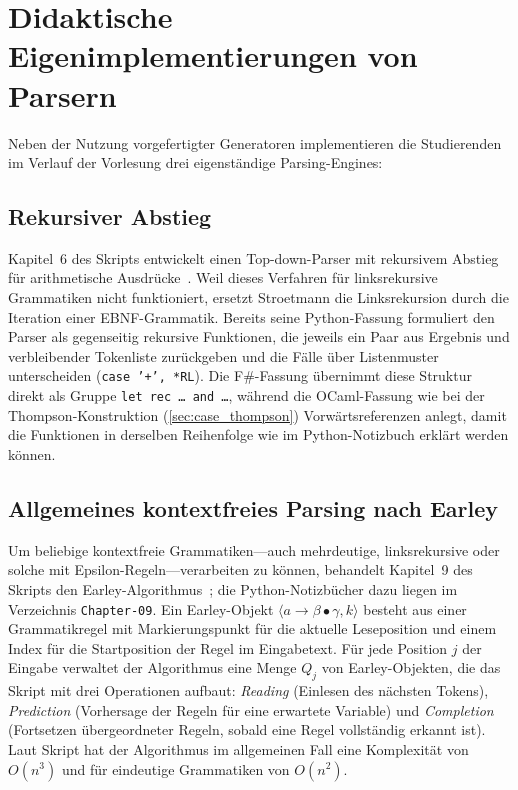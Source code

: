 \section{Didaktische Eigenimplementierungen von Parsern}
\label{sec:handcrafted_parsers}

Neben der Nutzung vorgefertigter Generatoren implementieren die Studierenden im Verlauf der Vorlesung drei eigenständige Parsing-Engines:

\subsection{Rekursiver Abstieg}
Kapitel~6 des Skripts entwickelt einen Top-down-Parser mit rekursivem Abstieg für arithmetische Ausdrücke~\cite{stroetmann2026formal}.
Weil dieses Verfahren für linksrekursive Grammatiken nicht funktioniert, ersetzt Stroetmann die Linksrekursion durch die Iteration einer EBNF-Grammatik.
Bereits seine Python-Fassung formuliert den Parser als gegenseitig rekursive Funktionen, die jeweils ein Paar aus Ergebnis und verbleibender Tokenliste zurückgeben und die Fälle über Listenmuster unterscheiden (\texttt{case '+', *RL}).
Die F\#-Fassung übernimmt diese Struktur direkt als Gruppe \texttt{let rec \dots{} and \dots}, während die OCaml-Fassung wie bei der Thompson-Konstruktion (\cref{sec:case_thompson}) Vorwärtsreferenzen anlegt, damit die Funktionen in derselben Reihenfolge wie im Python-Notizbuch erklärt werden können.

\subsection{Allgemeines kontextfreies Parsing nach Earley}
Um beliebige kontextfreie Grammatiken---auch mehrdeutige, linksrekursive oder solche mit Epsilon-Regeln---verarbeiten zu können, behandelt Kapitel~9 des Skripts den Earley-Algorithmus~\cite{earley1970efficient}; die Python-Notizbücher dazu liegen im Verzeichnis \texttt{Chapter-09}.
Ein Earley-Objekt $\langle a \to \beta \bullet \gamma, k \rangle$ besteht aus einer Grammatikregel mit Markierungspunkt für die aktuelle Leseposition und einem Index für die Startposition der Regel im Eingabetext.
Für jede Position $j$ der Eingabe verwaltet der Algorithmus eine Menge $Q_j$ von Earley-Objekten, die das Skript mit drei Operationen aufbaut: \emph{Reading} (Einlesen des nächsten Tokens), \emph{Prediction} (Vorhersage der Regeln für eine erwartete Variable) und \emph{Completion} (Fortsetzen übergeordneter Regeln, sobald eine Regel vollständig erkannt ist).
Laut Skript hat der Algorithmus im allgemeinen Fall eine Komplexität von $O(n^3)$ und für eindeutige Grammatiken von $O(n^2)$.

